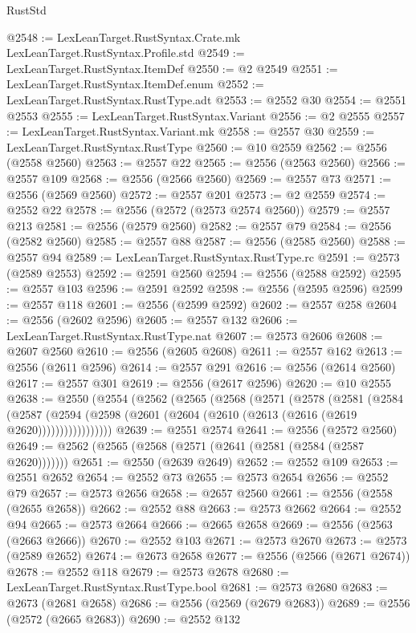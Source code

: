 \begin{lexlean}{RustStd}
\begin{coremodule}
@2548 := LexLeanTarget.RustSyntax.Crate.mk LexLeanTarget.RustSyntax.Profile.std
@2549 := LexLeanTarget.RustSyntax.ItemDef
@2550 := @2 @2549
@2551 := LexLeanTarget.RustSyntax.ItemDef.enum
@2552 := LexLeanTarget.RustSyntax.RustType.adt
@2553 := @2552 @30
@2554 := @2551 @2553
@2555 := LexLeanTarget.RustSyntax.Variant
@2556 := @2 @2555
@2557 := LexLeanTarget.RustSyntax.Variant.mk
@2558 := @2557 @30
@2559 := LexLeanTarget.RustSyntax.RustType
@2560 := @10 @2559
@2562 := @2556 (@2558 @2560)
@2563 := @2557 @22
@2565 := @2556 (@2563 @2560)
@2566 := @2557 @109
@2568 := @2556 (@2566 @2560)
@2569 := @2557 @73
@2571 := @2556 (@2569 @2560)
@2572 := @2557 @201
@2573 := @2 @2559
@2574 := @2552 @22
@2578 := @2556 (@2572 (@2573 @2574 @2560))
@2579 := @2557 @213
@2581 := @2556 (@2579 @2560)
@2582 := @2557 @79
@2584 := @2556 (@2582 @2560)
@2585 := @2557 @88
@2587 := @2556 (@2585 @2560)
@2588 := @2557 @94
@2589 := LexLeanTarget.RustSyntax.RustType.rc
@2591 := @2573 (@2589 @2553)
@2592 := @2591 @2560
@2594 := @2556 (@2588 @2592)
@2595 := @2557 @103
@2596 := @2591 @2592
@2598 := @2556 (@2595 @2596)
@2599 := @2557 @118
@2601 := @2556 (@2599 @2592)
@2602 := @2557 @258
@2604 := @2556 (@2602 @2596)
@2605 := @2557 @132
@2606 := LexLeanTarget.RustSyntax.RustType.nat
@2607 := @2573 @2606
@2608 := @2607 @2560
@2610 := @2556 (@2605 @2608)
@2611 := @2557 @162
@2613 := @2556 (@2611 @2596)
@2614 := @2557 @291
@2616 := @2556 (@2614 @2560)
@2617 := @2557 @301
@2619 := @2556 (@2617 @2596)
@2620 := @10 @2555
@2638 := @2550
    (@2554
      (@2562
        (@2565
          (@2568
            (@2571
              (@2578
                (@2581
                  (@2584
                    (@2587
                      (@2594 (@2598 (@2601 (@2604 (@2610 (@2613 (@2616 (@2619 @2620)))))))))))))))))
@2639 := @2551 @2574
@2641 := @2556 (@2572 @2560)
@2649 := @2562 (@2565 (@2568 (@2571 (@2641 (@2581 (@2584 (@2587 @2620)))))))
@2651 := @2550 (@2639 @2649)
@2652 := @2552 @109
@2653 := @2551 @2652
@2654 := @2552 @73
@2655 := @2573 @2654
@2656 := @2552 @79
@2657 := @2573 @2656
@2658 := @2657 @2560
@2661 := @2556 (@2558 (@2655 @2658))
@2662 := @2552 @88
@2663 := @2573 @2662
@2664 := @2552 @94
@2665 := @2573 @2664
@2666 := @2665 @2658
@2669 := @2556 (@2563 (@2663 @2666))
@2670 := @2552 @103
@2671 := @2573 @2670
@2673 := @2573 (@2589 @2652)
@2674 := @2673 @2658
@2677 := @2556 (@2566 (@2671 @2674))
@2678 := @2552 @118
@2679 := @2573 @2678
@2680 := LexLeanTarget.RustSyntax.RustType.bool
@2681 := @2573 @2680
@2683 := @2673 (@2681 @2658)
@2686 := @2556 (@2569 (@2679 @2683))
@2689 := @2556 (@2572 (@2665 @2683))
@2690 := @2552 @132

\end{coremodule}
\end{lexlean}
